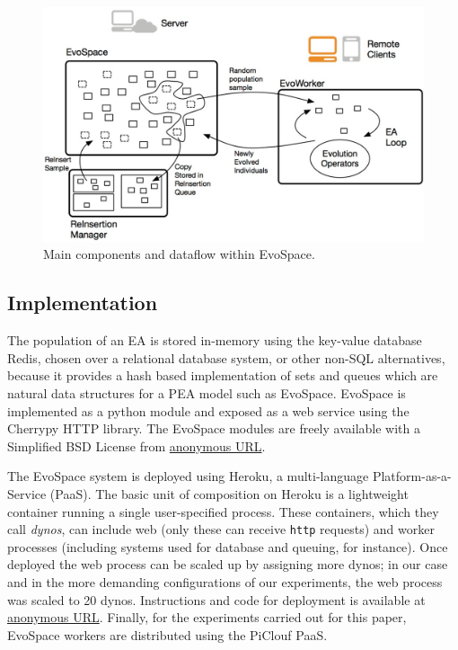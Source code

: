 \documentclass{sig-alternate}
\begin{document}
\begin{figure}[t]
    \centering
        \includegraphics[width=5in]{eps/evospaceExample.eps}
    \caption{Main components and dataflow within EvoSpace.}
    \label{fig:evo}
\end{figure}


\subsection{Implementation}
The population of an EA is stored in-memory using the key-value database Redis, chosen over a relational database system, or other non-SQL 
alternatives, because it provides a hash based implementation of sets  and queues which are natural data structures for a PEA model such as EvoSpace. 
EvoSpace is implemented as a python module and exposed as a web service using the Cherrypy HTTP library.
The EvoSpace modules are freely available with  a Simplified BSD License from \url{anonymous URL}.

The EvoSpace system is deployed using Heroku, a multi-language Platform-as-a-Service (PaaS).
The basic unit of composition on
Heroku is a lightweight container running a single user-specified process.
These containers, which they call {\em dynos}, can include web (only these can receive {\tt http} requests) and worker processes
(including systems used for database and queuing, for instance).
Once deployed the web process can be scaled up by assigning more dynos;
in our case and in the more demanding configurations of our experiments, 
the web process was scaled to 20 dynos. Instructions and code for deployment 
is available at \url{anonymous URL}.
Finally, for the experiments carried out for this paper, EvoSpace workers are distributed using the PiClouf PaaS.
\end{document}
